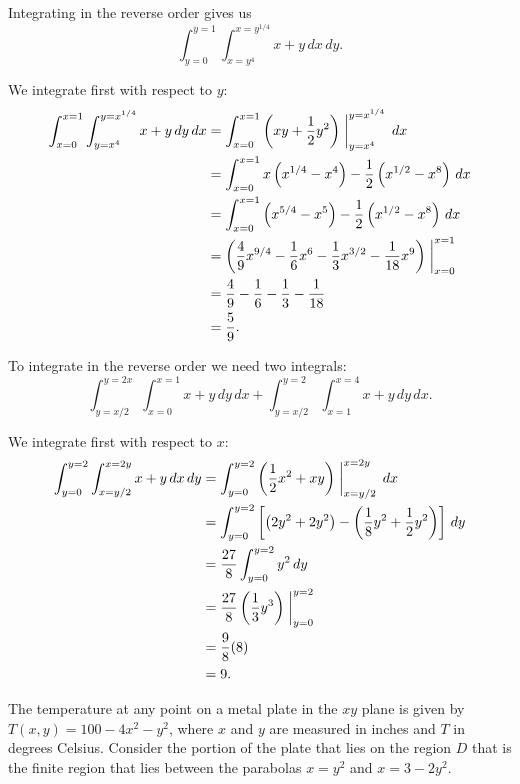 \begin{exercises}
\begin{exerciseSolution}
	\item Integrating in the reverse order gives us 
\[\int_{y=0}^{y=1}  \int_{x=y^{4}}^{x=y^{1/4}} x+y \, dx  \, dy.\]

We integrate first with respect to $y$:
\begin{align*}
\int_{x=0}^{x=1}  \int_{y=x^4}^{y=x^{1/4}} x+y \, dy  \, dx &= \int_{x=0}^{x=1} \left(xy + \frac{1}{2}y^2 \right) \biggm|_{y=x^4}^{y=x^{1/4}}  \, dx \\
	&= \int_{x=0}^{x=1} x\left(x^{1/4}-x^4\right) - \frac{1}{2}\left(x^{1/2}-x^8\right) \, dx \\
	&= \int_{x=0}^{x=1} \left(x^{5/4}-x^5\right) - \frac{1}{2}\left(x^{1/2}-x^8\right) \, dx \\
	&=\left(\frac{4}{9}x^{9/4} - \frac{1}{6}x^6 - \frac{1}{3}x^{3/2} - \frac{1}{18}x^9\right)\biggm|_{x=0}^{x=1} \\
	&= \frac{4}{9} - \frac{1}{6} - \frac{1}{3} - \frac{1}{18} \\
	&= \frac{5}{9}.
\end{align*}

	\item To integrate in the reverse order we need two integrals:
\[\int_{y=x/2}^{y=2x}  \int_{x=0}^{x=1} x+y \, dy  \, dx + \int_{y=x/2}^{y=2}  \int_{x=1}^{x=4} x+y \, dy  \, dx.\]

We integrate first with respect to $x$:
\begin{align*}
\int_{y=0}^{y=2}  \int_{x=y/2}^{x=2y} x+y \, dx  \, dy &= \int_{y=0}^{y=2} \left(\frac{1}{2}x^2 +xy\right) \biggm|_{x=y/2}^{x=2y}  \, dx \\
	&= \int_{y=0}^{y=2} \left[\left(2y^2+2y^2\right) - \left(\frac{1}{8}y^2 + \frac{1}{2}y^2\right)\right] \, dy \\
	&= \frac{27}{8} \int_{y=0}^{y=2} y^2 \, dy \\
	&= \frac{27}{8} \left(\frac{1}{3}y^3\right)\biggm|_{y=0}^{y=2} \\
	&= \frac{9}{8}(8) \\
	&= 9.
\end{align*}

\ea
\end{exerciseSolution}

\item The temperature at any point on a metal plate in the $xy$ plane is given by $T(x,y) = 100-4x^2 - y^2$, where $x$ and $y$ are measured in inches and $T$ in degrees Celsius.  Consider the portion of the plate that lies on the region $D$ that is the finite region that lies between the parabolas $x = y^2$ and $x = 3 - 2y^2$.


\end{exercises}
